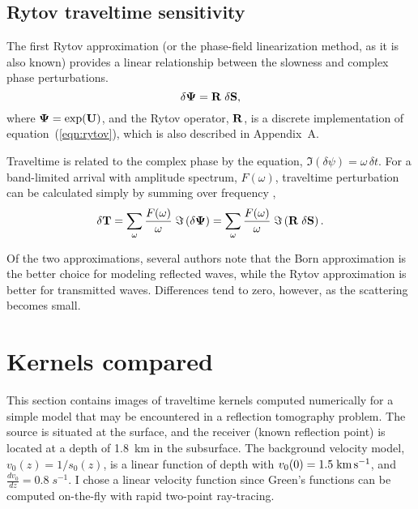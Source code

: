 \subsection{Rytov traveltime sensitivity}
The first Rytov approximation (or the phase-field linearization
method, as it is also known) provides a linear relationship between
the slowness and complex phase perturbations.
\begin{equation}
{\bf \delta \Psi} = {\bf R \; \delta S},
\end{equation}
where ${\bf \Psi}=\exp({\bf U})$, and the Rytov operator, ${\bf R}$,
is a discrete implementation of equation~(\ref{eqn:rytov}), which is
also described in Appendix~A.  

\par
Traveltime is related to the complex phase by the equation,
$\Im (\delta \psi)=\omega \, \delta t$.
For a band-limited arrival with amplitude spectrum, $F(\omega)$,
traveltime perturbation can be calculated simply by summing over
frequency \cite[]{woodward92}, 
\begin{equation}
{\bf \delta T} = \sum_\omega \frac{F(\omega)}{\omega} \;
\Im \left({\bf \delta \Psi}\right) = 
\sum_\omega \frac{F(\omega)}{\omega} 
\;\Im \left( {\bf R \; \delta S}\right).
\end{equation}

\par
Of the two approximations, several authors
\cite[]{beydoun88,Woodward.sep.60.203} note that the Born approximation 
is the better choice for modeling reflected waves, while the Rytov
approximation is better for transmitted waves.  Differences tend to
zero, however, as the scattering becomes small.

\section{Kernels compared}

This section contains images of traveltime kernels computed
numerically for a simple model that may be encountered in a reflection
tomography problem.  The source is situated at the surface, and the
receiver (known reflection point) is located at a depth of 1.8~km in
the subsurface.  The background velocity model, $v_0(z)=1/s_0(z)$, is
a linear function of depth with $v_0(0)=1.5 \;{\rm km\, s^{-1}}$, and
$\frac{dv_0}{dz}= 0.8 \; s^{-1}$.  I chose a linear velocity function
since Green's functions can be computed on-the-fly with rapid two-point
ray-tracing.  

